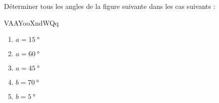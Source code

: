 
\begin{exercice}\label{exo2smath-0069}

    Déterminer tous les angles de la figure suivante dans les cas suivants :

VAAYooXndWQq

    \begin{multicols}{3}
        \begin{enumerate}
            \item
                \( a=\SI{15}{\degree}\) 
            \item
                \( a=\SI{60}{\degree}\) 
            \item
                \( a=\SI{45}{\degree}\) 
            \item
                \( b=\SI{70}{\degree}\) 
            \item
                \( b=\SI{5}{\degree}\) 
        \end{enumerate}
    \end{multicols}

\end{exercice}
